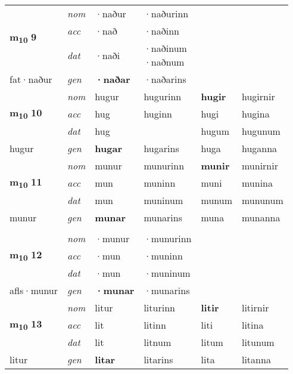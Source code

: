 \begin{longtable}[l]{X>{\footnotesize\itshape}XXXXX}
\multirow{3}{*}{{{\textbf{m{\textsubscript{10}}} \Large{\textbf{9}}}}} & nom & ·naður & ·naðurinn & \textbf{} &  \\*
 & acc & ·nað & ·naðinn &  &  \\*
 & dat & ·naði & \specialcell{·naðinum\\  ·naðnum} &  &  \\*
 {\footnotesize{fat\allowbreak ·naður}} & gen & \textbf{·naðar} & ·naðarins &  &  \\
\cmidrule{1-6}

\multirow{3}{*}{{{\textbf{m{\textsubscript{10}}} \Large{\textbf{10}}}}} & nom & hugur & hugurinn & \textbf{hugir} & hugirnir \\*
 & acc & hug & huginn & hugi & hugina \\*
 & dat & hug &  & hugum & hugunum \\*
 {\footnotesize{hugur}} & gen & \textbf{hugar} & hugarins & huga & huganna \\
\cmidrule{1-6}

\multirow{3}{*}{{{\textbf{m{\textsubscript{10}}} \Large{\textbf{11}}}}} & nom & munur & munurinn & \textbf{munir} & munirnir \\*
 & acc & mun & muninn & muni & munina \\*
 & dat & mun & muninum & munum & mununum \\*
 {\footnotesize{munur}} & gen & \textbf{munar} & munarins & muna & munanna \\*
 &  &  &  &  &  \\

\multirow{3}{*}{{{\textbf{m{\textsubscript{10}}} \Large{\textbf{12}}}}} & nom & ·munur & ·munurinn & \textbf{} &  \\*
 & acc & ·mun & ·muninn &  &  \\*
 & dat & ·mun & ·muninum &  &  \\*
 {\footnotesize{afls\allowbreak ·munur}} & gen & \textbf{·munar} & ·munarins &  &  \\
\cmidrule{1-6}

\multirow{3}{*}{{{\textbf{m{\textsubscript{10}}} \Large{\textbf{13}}}}} & nom & litur & liturinn & \textbf{litir} & litirnir \\*
 & acc & lit & litinn & liti & litina \\*
 & dat & lit & litnum & litum & litunum \\*
 {\footnotesize{litur}} & gen & \textbf{litar} & litarins & lita & litanna \\
\cmidrule{1-6}


\end{longtable}
